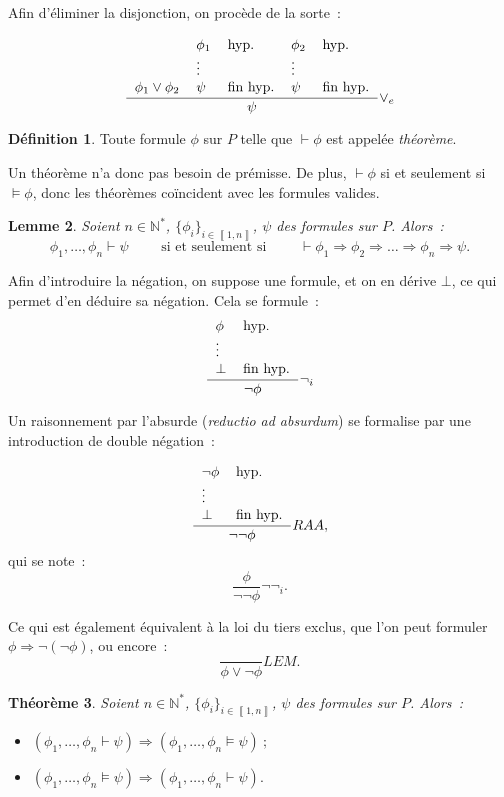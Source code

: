 \documentclass{article}
\newtheorem{thm}{Théorème}[section]
\newtheorem{lem}[thm]{Lemme}
\theoremstyle{definition}
\newtheorem{déf}[thm]{Définition}
\theoremstyle{remark}
\newcommand{\intint}[2]{\left\llbracket#1, #2\right\rrbracket}
\newcommand{\N}{\mathbb N}
\begin{document}
	Afin d'éliminer la disjonction, on procède de la sorte~:

	\[\frac {
		\begin{tabular}{l l l l l}
			& $\phi_1$ & hyp. & $\phi_2$ & hyp. \\
			& \vdots   &       &  \vdots  & \\
			$\phi_1 \lor \phi_2$ & $\psi$ & fin hyp. & $\psi$ & fin hyp.
		\end{tabular}
	}{\psi}\lor_e\]

	\begin{déf} Toute formule $\phi$ sur $P$ telle que $\vdash \phi$ est appelée \textit{théorème}.
	\end{déf}

	Un théorème n'a donc pas besoin de prémisse. De plus, $\vdash \phi$ si et seulement si $\models \phi$, donc les théorèmes coïncident avec les formules valides.

	\begin{lem} Soient $n \in \N^*$, $\{\phi_i\}_{i \in \intint 1n}$, $\psi$ des formules sur $P$. Alors~:
	\[\phi_1, \ldots, \phi_n \vdash \psi \qquad \text{ si et seulement si }
		\qquad \vdash \phi_1 \Rightarrow \phi_2 \Rightarrow \ldots \Rightarrow \phi_n \Rightarrow \psi.\]
	\end{lem}

	Afin d'introduire la négation, on suppose une formule, et on en dérive $\bot$, ce qui permet d'en déduire sa négation. Cela se formule~:
	\[\frac {\begin{tabular}{l l}$\phi$ & hyp. \\ \vdots &\\$\bot$ & fin hyp.\end{tabular}}{\lnot\phi}\lnot_i\]

	Un raisonnement par l'absurde (\textit{reductio ad absurdum}) se formalise par une introduction de double négation~:

	\[\frac {\begin{tabular}{l l}$\lnot \phi$ & hyp. \\ \vdots &\\ $\bot$ & fin hyp.\end{tabular}}{\lnot\lnot \phi}RAA,\]
	qui se note~:
	\[\frac {\phi}{\lnot\lnot\phi}\lnot\lnot_i.\]

	Ce qui est également équivalent à la loi du tiers exclus, que l'on peut formuler $\phi \Rightarrow \lnot(\lnot\phi)$, ou encore~:
	\[\frac {}{\phi \lor \lnot \phi}LEM.\]

	\begin{thm}Soient $n \in \N^*$, $\{\phi_i\}_{i \in \intint 1n}$, $\psi$ des formules sur $P$. Alors~:
	\begin{itemize}
		\item[(Adéquation)] $\left(\phi_1, \ldots, \phi_n \vdash  \psi\right) \Rightarrow \left(\phi_1, \ldots, \phi_n \models \psi\right)~;$
		\item[(Complétude)] $\left(\phi_1, \ldots, \phi_n \models \psi\right) \Rightarrow \left(\phi_1, \ldots, \phi_n \vdash  \psi\right).$
	\end{itemize}
	\end{thm}
\end{document}
